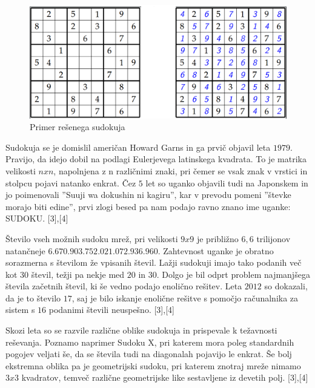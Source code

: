 \documentclass[A4paper, 11pt]{article}
\begin{document}
\begin{figure}[h]
\centering
\caption{Primer rešenega sudokuja}
\includegraphics[scale=0.4]{sudoku_resen}
\end{figure}

Sudokuja se je domislil američan Howard Garns in ga prvič objavil leta $1979$. Pravijo, da idejo dobil na podlagi Eulerjevega latinskega kvadrata. To je matrika velikosti $nxn$, napolnjena z n različnimi znaki, pri čemer se vsak znak v vrstici in stolpcu pojavi natanko enkrat. Čez $5$ let so uganko objavili tudi na Japonskem in jo poimenovali ''Suuji wa dokushin ni kagiru'', kar v prevodu pomeni ''števke morajo biti edine'', prvi zlogi besed pa nam podajo ravno znano ime uganke: SUDOKU. [3],[4]

Število vseh možnih sudoku mrež, pri velikosti $9x9$ je približno $6,6$ trilijonov natančneje $6.670.903.752.021.072.936.960$. Zahtevnost uganke je obratno sorazmerna s številom že vpisanih števil. Lažji sudokuji imajo tako podanih več kot $30$ števil, težji pa nekje med $20$ in $30$. Dolgo je bil odprt problem najmanjšega števila začetnih števil, ki še vedno podajo enolično rešitev. Leta $2012$ so dokazali, da je to število $17$, saj je bilo iskanje enolične rešitve s pomočjo računalnika za sistem s $16$ podanimi števili neuspešno. [3],[4]

Skozi leta so se razvile različne oblike sudokuja in prispevale k težavnosti reševanja. Poznamo naprimer Sudoku X, pri katerem mora poleg standardnih pogojev veljati še, da se števila tudi na diagonalah pojavijo le enkrat. Še bolj ekstremna oblika pa je geometrijski sudoku, pri katerem znotraj mreže nimamo $3x3$ kvadratov, temveč različne geometrijske like sestavljene iz devetih polj. [3],[4]
\end{document}
